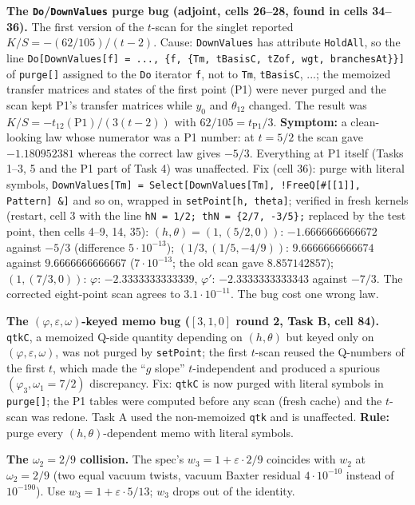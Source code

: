 \documentclass[10pt]{article}
\newcommand{\nb}[1]{\texttt{#1}}
\begin{document}
\textbf{The \nb{Do}/\nb{DownValues} purge bug (adjoint, cells 26--28, found in cells 34--36).} The first version of the $t$-scan for the singlet reported $K/S=-(62/105)/(t-2)$. Cause: \nb{DownValues} has attribute \nb{HoldAll}, so the line \nb{Do[DownValues[f] = .\allowbreak{}.\allowbreak{}.\allowbreak{}, \{f, \{Tm, tBasisC, tZof, wgt, branchesAt\}\}]} of \nb{purge[]} assigned to the \nb{Do} iterator \nb{f}, not to \nb{Tm}, \nb{tBasisC}, ...; the memoized transfer matrices and states of the first point (P1) were never purged and the scan kept P1's transfer matrices while $y_0$ and $\theta_{12}$ changed. The result was $K/S=-t_{12}(\mathrm{P1})/(3(t-2))$ with $62/105=t_{\mathrm{P1}}/3$. \textbf{Symptom:} a clean-looking law whose numerator was a P1 number: at $t=5/2$ the scan gave $-1.180952381$ whereas the correct law gives $-5/3$. Everything at P1 itself (Tasks 1--3, 5 and the P1 part of Task 4) was unaffected. Fix (cell 36): purge with literal symbols, \nb{DownValues[Tm] = Select[DownValues[Tm], !FreeQ[\#[[1]], Pattern] \&]} and so on, wrapped in \nb{setPoint[h, theta]}; verified in fresh kernels (restart, cell 3 with the line \nb{hN = 1/\allowbreak{}2; thN = \{2/\allowbreak{}7, -\allowbreak{}3/\allowbreak{}5\};} replaced by the test point, then cells 4--9, 14, 35): $(h,\theta)=(1,(5/2,0))$: $-1.6666666666672$ against $-5/3$ (difference $5\cdot10^{-13}$); $(1/3,(1/5,-4/9))$: $9.6666666666674$ against $9.6666666666667$ ($7\cdot10^{-13}$; the old scan gave $8.857142857$); $(1,(7/3,0))$: $\varphi$: $-2.3333333333339$, $\varphi'$: $-2.3333333333343$ against $-7/3$. The corrected eight-point scan agrees to $3.1\cdot10^{-11}$. The bug cost one wrong law.

\textbf{The $(\varphi,\varepsilon,\omega)$-keyed memo bug ($[3,1,0]$ round 2, Task B, cell 84).} \nb{qtkC}, a memoized Q-side quantity depending on $(h,\theta)$ but keyed only on $(\varphi,\varepsilon,\omega)$, was not purged by \nb{setPoint}; the first $t$-scan reused the Q-numbers of the first $t$, which made the ``$g$ slope'' $t$-independent and produced a spurious $(\varphi_3,\omega_1=7/2)$ discrepancy. Fix: \nb{qtkC} is now purged with literal symbols in \nb{purge[]}; the P1 tables were computed before any scan (fresh cache) and the $t$-scan was redone. Task A used the non-memoized \nb{qtk} and is unaffected. \textbf{Rule:} purge every $(h,\theta)$-dependent memo with literal symbols.

\textbf{The $\omega_2=2/9$ collision.} The spec's $w_3=1+\varepsilon\cdot2/9$ coincides with $w_2$ at $\omega_2=2/9$ (two equal vacuum twists, vacuum Baxter residual $4\cdot10^{-10}$ instead of $10^{-190}$). Use $w_3=1+\varepsilon\cdot5/13$; $w_3$ drops out of the identity.
\end{document}
